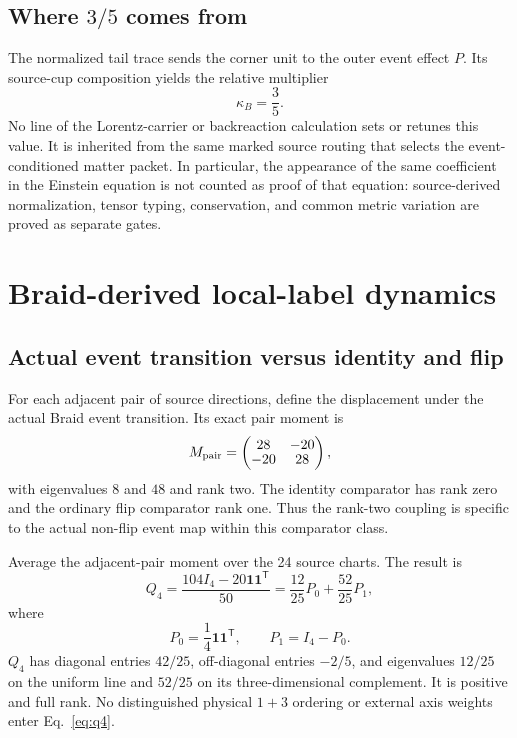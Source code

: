 \documentclass[11pt]{article}
\theoremstyle{definition}
\theoremstyle{remark}
\begin{document}
\subsection{Where $3/5$ comes from}

The normalized tail trace sends the corner unit to the outer event effect $P$. Its source-cup composition yields the relative multiplier
\begin{equation}
 \kappa_B=\frac35.
\end{equation}
No line of the Lorentz-carrier or backreaction calculation sets or retunes this value. It is inherited from the same marked source routing that selects the event-conditioned matter packet. In particular, the appearance of the same coefficient in the Einstein equation is not counted as proof of that equation: source-derived normalization, tensor typing, conservation, and common metric variation are proved as separate gates.

\section{Braid-derived local-label dynamics}

\subsection{Actual event transition versus identity and flip}

For each adjacent pair of source directions, define the displacement under the actual Braid event transition. Its exact pair moment is
\begin{equation}
 M_{\rm pair}=
 \begin{pmatrix}
 28&-20\\[-0.15em]
 -20&28
 \end{pmatrix},
\end{equation}
with eigenvalues $8$ and $48$ and rank two. The identity comparator has rank zero and the ordinary flip comparator rank one. Thus the rank-two coupling is specific to the actual non-flip event map within this comparator class.

Average the adjacent-pair moment over the 24 source charts. The result is
\begin{equation}\label{eq:q4}
 Q_4=\frac{104I_4-20\mathbf1\mathbf1^{\mathsf T}}{50}
 =\frac{12}{25}P_0+\frac{52}{25}P_1,
\end{equation}
where
\begin{equation}
 P_0=\frac14\mathbf1\mathbf1^{\mathsf T},\qquad
 P_1=I_4-P_0.
\end{equation}
$Q_4$ has diagonal entries $42/25$, off-diagonal entries $-2/5$, and eigenvalues $12/25$ on the uniform line and $52/25$ on its three-dimensional complement. It is positive and full rank. No distinguished physical $1+3$ ordering or external axis weights enter Eq.~\eqref{eq:q4}.
\end{document}
